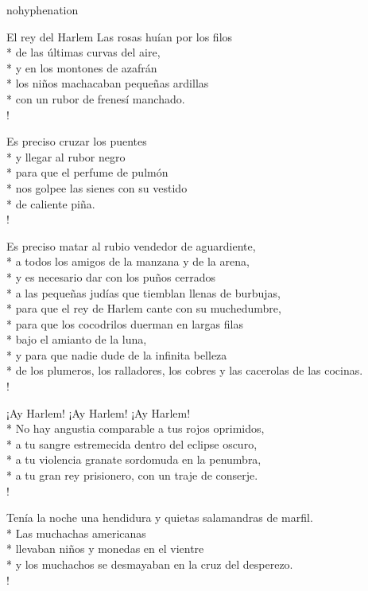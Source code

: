 \documentclass[
    a5paper,
    DIV=10,
    12pt,
    notitlepage,
    oneside,]
{scrbook} %
\begin{document}
\begin{hyphenrules}{nohyphenation}
\begin{poem}{El rey del Harlem}{}{\vspace{-1em}}
Las rosas huían por los filos\\*
de las últimas curvas del aire,\\*
y en los montones de azafrán\\*
los niños machacaban pequeñas ardillas\\*
con un rubor de frenesí manchado.\\!

Es preciso cruzar los puentes\\*
y llegar al rubor negro\\*
para que el perfume de pulmón\\*
nos golpee las sienes con su vestido\\*
de caliente piña.\\!

Es preciso matar al rubio vendedor de aguardiente,\\*
a todos los amigos de la manzana y de la arena,\\*
y es necesario dar con los puños cerrados\\*
a las pequeñas judías que tiemblan llenas de burbujas,\\*
para que el rey de Harlem cante con su muchedumbre,\\*
para que los cocodrilos duerman en largas filas\\*
bajo el amianto de la luna,\\*
y para que nadie dude de la infinita belleza\\*
de los plumeros, los ralladores, los cobres y las cacerolas de las cocinas.\\!

¡Ay Harlem! ¡Ay Harlem! ¡Ay Harlem!\\*
No hay angustia comparable a tus rojos oprimidos,\\*
a tu sangre estremecida dentro del eclipse oscuro,\\*
a tu violencia granate sordomuda en la penumbra,\\*
a tu gran rey prisionero, con un traje de conserje.\\!

\ptspacer

Tenía la noche una hendidura y quietas salamandras de marfil.\\*
Las muchachas americanas\\*
llevaban niños y monedas en el vientre\\*
y los muchachos se desmayaban en la cruz del desperezo.\\!


\end{poem}
\end{hyphenrules}
\end{document}
